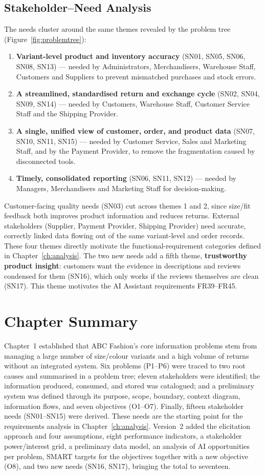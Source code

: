 \documentclass[11pt,a4paper,oneside]{extreport}
\newif\ifshowvtwo
\newcommand{\upd}[1]{\ifshowvtwo\textcolor{red}{#1}\else#1\fi}
\begin{document}
\subsection{Stakeholder--Need Analysis}
The needs cluster around the same themes revealed by the problem tree (Figure~\ref{fig:problemtree}):
\begin{enumerate}
  \item \textbf{Variant-level product and inventory accuracy} (SN01, SN05, SN06, SN08, SN13) --- needed by Administrators, Merchandisers, Warehouse Staff, Customers and Suppliers to prevent mismatched purchases and stock errors.
  \item \textbf{A streamlined, standardised return and exchange cycle} (SN02, SN04, SN09, SN14) --- needed by Customers, Warehouse Staff, Customer Service Staff and the Shipping Provider.
  \item \textbf{A single, unified view of customer, order, and product data} (SN07, SN10, SN11, SN15) --- needed by Customer Service, Sales and Marketing Staff, and by the Payment Provider, to remove the fragmentation caused by disconnected tools.
  \item \textbf{Timely, consolidated reporting} (SN06, SN11, SN12) --- needed by Managers, Merchandisers and Marketing Staff for decision-making.
\end{enumerate}
Customer-facing quality needs (SN03) cut across themes 1 and 2, since size/fit feedback both improves product information and reduces returns. External stakeholders (Supplier, Payment Provider, Shipping Provider) need accurate, correctly linked data flowing out of the same variant-level and order records. These four themes directly motivate the functional-requirement categories defined in Chapter~\ref{ch:analysis}. \upd{The two new needs add a fifth theme, \textbf{trustworthy product insight}: customers want the evidence in descriptions and reviews condensed for them (SN16), which only works if the reviews themselves are clean (SN17). This theme motivates the AI Assistant requirements FR39--FR45.}

\section{Chapter Summary}
Chapter~1 established that ABC Fashion's core information problems stem from managing a large number of size/colour variants and a high volume of returns without an integrated system. Six problems (P1--P6) were traced to two root causes and summarised in a problem tree; eleven stakeholders were identified; the information produced, consumed, and stored was catalogued; and a preliminary system was defined through its purpose, scope, boundary, context diagram, information flows, and seven objectives (O1--O7). Finally, fifteen stakeholder needs (SN01--SN15) were derived. These needs are the starting point for the requirements analysis in Chapter~\ref{ch:analysis}. \upd{Version~2 added the elicitation approach and four assumptions, eight performance indicators, a stakeholder power/interest grid, a preliminary data model, an analysis of AI opportunities per problem, SMART targets for the objectives together with a new objective (O8), and two new needs (SN16, SN17), bringing the total to seventeen.}
\end{document}
